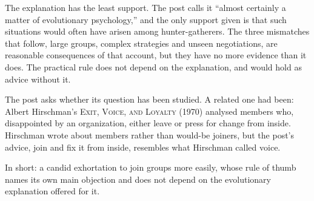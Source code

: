 \begin{afterword}
The explanation has the least support. The post calls it ``almost certainly a matter of evolutionary psychology,'' and the only support given is that such situations would often have arisen among hunter-gatherers. The three mismatches that follow, large groups, complex strategies and unseen negotiations, are reasonable consequences of that account, but they have no more evidence than it does. The practical rule does not depend on the explanation, and would hold as advice without it.

The post asks whether its question has been studied. A related one had been: Albert Hirschman's \textsc{Exit, Voice, and Loyalty} (1970) analysed members who, disappointed by an organization, either leave or press for change from inside. Hirschman wrote about members rather than would-be joiners, but the post's advice, join and fix it from inside, resembles what Hirschman called voice.

In short: a candid exhortation to join groups more easily, whose rule of thumb names its own main objection and does not depend on the evolutionary explanation offered for it.
\end{afterword}
